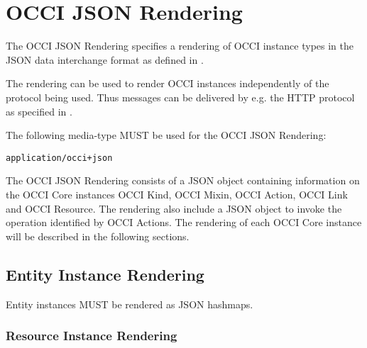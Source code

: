 \documentclass[10pt,a4paper]{article}
\begin{document}
\section{OCCI JSON Rendering}
\label{sec:json_format}
The OCCI JSON Rendering specifies a rendering of OCCI instance types in the JSON
data interchange format as defined in \cite{rfc4627}.

The rendering can be used to render OCCI instances independently of the
protocol being used. Thus messages can be delivered by e.g. the HTTP
protocol as specified in \cite{occi:protocol}.

The following media-type MUST be used for the OCCI JSON Rendering:

{\tt application/occi+json}

The OCCI JSON Rendering consists of a JSON object containing information on the
OCCI Core instances OCCI Kind, OCCI Mixin, OCCI Action,
OCCI Link and OCCI Resource. The rendering also include a JSON object to invoke
the operation identified by OCCI Actions.
The rendering of each OCCI Core instance will be
described in the following sections.

\subsection{Entity Instance Rendering}
\label{sec:format_entity_instance_rendering}

Entity instances MUST be rendered as JSON hashmaps.

\subsubsection{Resource Instance Rendering}
\label{sec:format_resource}
\end{document}
